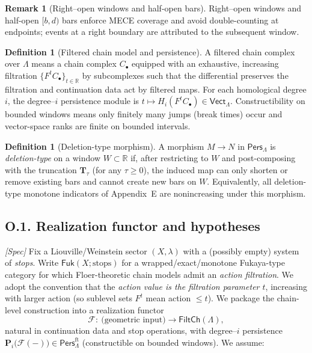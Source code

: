 \documentclass[11pt]{article}
\numberwithin{equation}{section}
\theoremstyle{plain}
\theoremstyle{definition}
\theoremstyle{remark}
\newcommand{\Pers}{\mathsf{Pers}}
\theoremstyle{plain}
\theoremstyle{definition}
\numberwithin{equation}{section}
\theoremstyle{definition}
\newtheorem{definition}[theorem]{Definition}
\newtheorem{remark}[theorem]{Remark}
\numberwithin{equation}{section}
\theoremstyle{plain}
\theoremstyle{definition}
\theoremstyle{remark}
\begin{document}
\begin{remark}[Right–open windows and half-open bars]\label{O:rmk:windows}
Right–open windows and half-open \([b,d)\) bars enforce MECE coverage and avoid double-counting at endpoints; events at a right boundary are attributed to the subsequent window.
\end{remark}

\begin{definition}[Filtered chain model and persistence]
A filtered chain complex over \(\Lambda\) means a chain complex \(C_\bullet\) equipped with an exhaustive, increasing filtration \(\{F^{t}C_\bullet\}_{t\in\mathbb{R}}\) by subcomplexes such that the differential preserves the filtration and continuation data act by filtered maps. For each homological degree \(i\), the degree–\(i\) persistence module is \(t\mapsto H_i(F^{t}C_\bullet)\in \mathsf{Vect}_\Lambda\). Constructibility on bounded windows means only finitely many jumps (break times) occur and vector-space ranks are finite on bounded intervals.
\end{definition}

\begin{definition}[Deletion-type morphism]\label{O:def:deletion}
A morphism \(M\to N\) in \(\Pers_\Lambda\) is \emph{deletion-type} on a window \(W\subset\mathbb{R}\) if, after restricting to \(W\) and post-composing with the truncation \(\mathbf{T}_\tau\) (for any \(\tau\ge 0\)), the induced map can only shorten or remove existing bars and cannot create new bars on \(W\). Equivalently, all deletion-type monotone indicators of Appendix~E are nonincreasing under this morphism.
\end{definition}

\subsection*{O.1. Realization functor and hypotheses}
\emph{[Spec]} Fix a Liouville/Weinstein sector \((X,\lambda)\) with a (possibly empty) system of \emph{stops}.
Write \(\mathsf{Fuk}(X;\mathrm{stops})\) for a wrapped/exact/monotone Fukaya-type category for which Floer-theoretic chain models admit an \emph{action filtration}.
We adopt the convention that the \emph{action value is the filtration parameter \(t\)}, increasing with larger action (so sublevel sets \(F^{t}\) mean action \(\le t\)).
We package the chain-level construction into a realization functor
\[
\mathcal{F}:\ \text{(geometric input)}\longrightarrow \mathsf{FiltCh}(\Lambda),
\]
natural in continuation data and stop operations, with degree–\(i\) persistence
\(\mathbf{P}_i\big(\mathcal{F}(-)\big)\in \Pers^{\mathrm{ft}}_\Lambda\) (constructible on bounded windows).
We assume:
\end{document}
